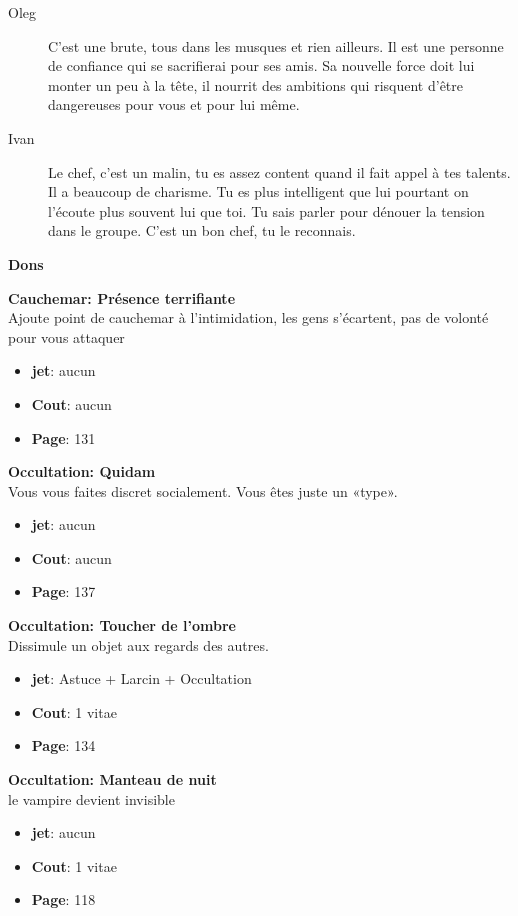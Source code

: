 \documentclass[oneside,12pt]{book}
\newcommand\don[5]{
\textbf{#1} \\
#2
\begin{itemize}
\item{ \textbf{jet}: #3}
\item{ \textbf{Cout}: #4}
\item{ \textbf{Page}: #5}
\end{itemize}
\vspace{0.5cm}
}
\begin{document}
\begin{flushleft}
\begin{description}
\item[Oleg]{C'est une brute, tous dans les musques et rien ailleurs. Il est une personne de confiance qui se sacrifierai pour ses amis. Sa nouvelle force doit lui monter un peu à la tête, il nourrit des ambitions qui risquent d'être dangereuses pour vous et pour lui même. }
\item[Ivan]{Le chef, c'est un malin, tu es assez content quand il fait appel à tes talents. Il a beaucoup de charisme. Tu es plus intelligent que lui pourtant on l'écoute plus souvent lui que toi. Tu sais parler pour dénouer la tension dans le groupe. C'est un bon chef, tu le reconnais.}
\end{description}
 
\clearpage
\textbf{\large Dons}
\vspace{0.5cm}

\don{Cauchemar: Présence terrifiante}{Ajoute point de cauchemar à l’intimidation, les gens s’écartent, pas de volonté pour vous attaquer}{aucun}{aucun}{131}
\don{Occultation: Quidam}{Vous vous faites discret socialement. Vous êtes juste un «type».}{aucun}{aucun}{137}
\don{Occultation: Toucher de l’ombre}{Dissimule un objet aux regards des autres.}{Astuce + Larcin + Occultation}{1 vitae}{134}
\don{Occultation: Manteau de nuit}{le vampire devient invisible}{aucun}{1 vitae}{118}


\clearpage

\end{flushleft}
\end{document}
